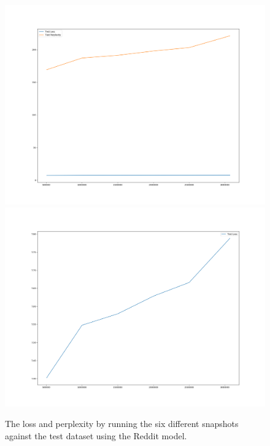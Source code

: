 \begin{figure}[H]
	\includegraphics[width=\linewidth]{img/plots/reddit/test_metrics_both.png}
	\centering
	\small
	\endminipage\hfill
	\includegraphics[width=\linewidth]{img/plots/reddit/test_metrics_loss.png}
	\centering
	\small
	\endminipage\hfill
	\caption{The loss and perplexity by running the six different snapshots against the test dataset using the Reddit model.}
	\label{result:test_performance:reddit}
\end{figure}

